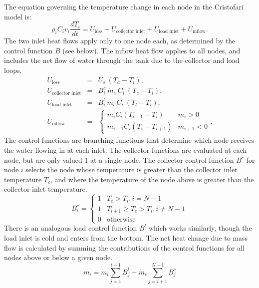 \documentclass{article}
\begin{document}
The equation governing the temperature change in each node in the Cristofari model is:
\begin{equation}
   \rho_i C_i v_i \frac{dT_i}{dt} = U_{\text{loss}} + U_{\text{collector inlet}} + U_{\text{load inlet}} + U_{\text{mflow}}.
\end{equation}
The two inlet heat flows apply only to one node each, as determined by the control function $B$ (see below).
The mflow heat flow applies to all nodes, and includes the net flow of water through the tank due to the collector and load loops.
\begin{eqnarray}
   U_{\text{loss}} &=& U_s\ (T_a - T_i), \\
   U_{\text{collector inlet}} &=& B^c_i\ \dot{m}_c\ C_i\ (T_c - T_i), \\
   U_{\text{load inlet}} &=& B^l_i\ \dot{m}_l\ C_i\ (T_l - T_i), \\
   U_{\text{mflow}} &=& \left\{ \begin{array}{ll}
      \dot{m}_i C_i (T_{i-1} - T_i) & \dot{m}_i > 0 \\
      \dot{m}_{i+1} C_i (T_i - T_{i+1}) & \dot{m}_{i+1} < 0
   \end{array} \right..
\end{eqnarray}
The control functions are branching functions that determine which node receives the water flowing in at each inlet.
The collector functions are evaluated at each node, but are only valued 1 at a single node.
The collector control function $B^c$ for node $i$ selects the node whose temperature is greater than the collector inlet temperature $T_c$, and where the temperature of the node above is greater than the collector inlet temperature.
\begin{equation}
   B^c_i = \left\{ \begin{array}{ll}
      1 & T_c > T_i, i = N-1 \\
      1 & T_{i+1} \ge T_c > T_i, i \ne N-1 \\
      0 & \text{otherwise}
   \end{array} \right.
\end{equation}
There is an analogous load control function $B^l$ which works similarly, though the load inlet is cold and enters from the bottom.
The net heat change due to mass flow is calculated by summing the contributions of the control functions for all nodes above or below a given node.
\begin{equation}
   \dot{m}_i = \dot{m}_l \sum_{j=1}^{i-1} B^l_j - \dot{m}_c \sum_{j=i+1}^{N-1} B^c_j
\end{equation}

\clearpage
\printbibliography[heading = bibintoc]
\end{document}
